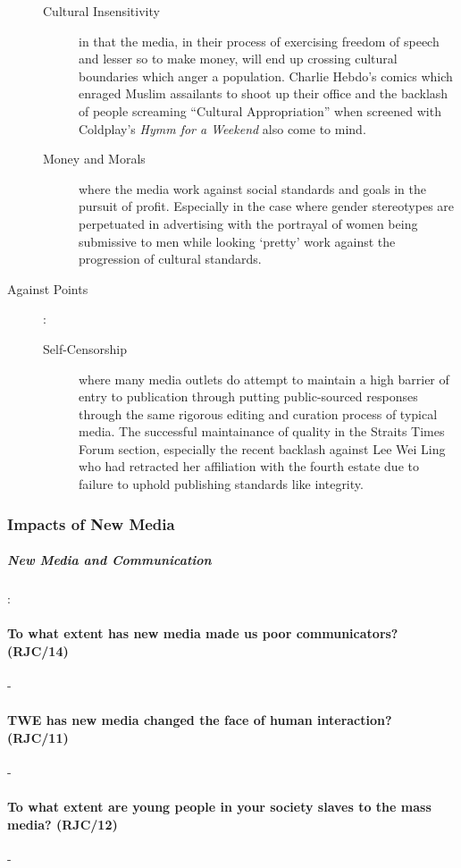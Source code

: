 \documentclass[../../main]{subfiles}
\begin{document}
\begin{description}
\begin{description}
			\item[Cultural Insensitivity] in that the media, in their process of exercising freedom of speech and lesser so to make money, will end up crossing cultural boundaries which anger a population. Charlie Hebdo's comics which enraged Muslim assailants to shoot up their office and the backlash of people screaming ``Cultural Appropriation'' when screened with Coldplay's \textit{Hymm for a Weekend} also come to mind.
			\item[Money and Morals] where the media work against social standards and goals in the pursuit of profit. Especially in the case where gender stereotypes are perpetuated in advertising with the portrayal of women being submissive to men while looking `pretty' work against the progression of cultural standards. 
		\end{description}
	\item[Against Points] :
		\begin{description}
			\item[Self-Censorship] where many media outlets do attempt to maintain a high barrier of entry to publication through putting public-sourced responses through the same rigorous editing and curation process of typical media. The successful maintainance of quality in the Straits Times Forum section, especially the recent backlash against Lee Wei Ling who had retracted her affiliation with the fourth estate due to failure to uphold publishing standards like integrity.
		\end{description}
\end{description}

\subsubsection{Impacts of New Media}

\subparagraph{New Media and Communication} :

\paragraph{To what extent has new media made us poor communicators? (RJC/14)}-

\paragraph{TWE has new media changed the face of human interaction? (RJC/11)}-

\paragraph{To what extent are young people in your society slaves to the mass media? (RJC/12)}-
\end{document}

